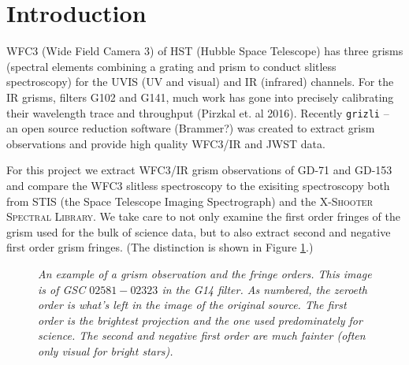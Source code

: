 \documentclass[12pt]{article}
\begin{document}

\section{Introduction}

WFC3 (Wide Field Camera 3) of HST (Hubble Space Telescope) has three grisms (spectral elements combining a grating and prism 
to conduct slitless spectroscopy) for the UVIS (UV and visual) and IR
(infrared) channels. For the IR grisms, filters 
G102 and G141, much work has gone into precisely calibrating their wavelength trace and throughput (Pirzkal et. al 2016). 
Recently \texttt{grizli} -- an open source reduction software (Brammer?) was created to extract grism observations 
and provide high quality WFC3/IR and JWST data. 

For this project we extract WFC3/IR grism
observations of GD-71 and GD-153 and compare the WFC3 slitless spectroscopy to the exisiting spectroscopy
both from STIS (the Space Telescope Imaging Spectrograph) and the
\textsc{X-Shooter Spectral Library}. We take care
to not only examine the first order fringes of the grism used for the bulk of science data, but to also 
extract second and negative first order grism fringes. (The distinction is shown in Figure \ref{fig:grism_orders}.)

\begin{figure}[h!]
\caption{\textit{An example of a grism observation and the fringe orders. This image is of
    GSC $02581-02323$ in the G14 filter. As numbered, 
    the zeroeth order is what's left in the image of the original source. The first order is
    the brightest projection and the one used predominately for science. The second and negative first 
    order are much fainter (often only visual for bright stars).}}
\label{fig:grism_orders}
\end{figure}
\end{document}
